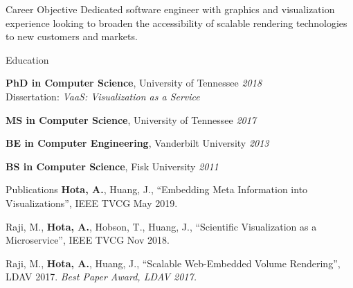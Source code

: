 \documentclass{resume} %
\begin{document}
\begin{multicols}{2}


\begin{rSection}{Career Objective}
  Dedicated software engineer with graphics and visualization experience looking to
  broaden the accessibility of scalable rendering technologies to new customers and
  markets.
\end{rSection}


\begin{rSection}{Education}

{{\bf PhD in Computer Science}, University of Tennessee} \hfill {\em 2018} \\ 
Dissertation: \emph{VaaS: Visualization as a Service}

{{\bf MS in Computer Science}, University of Tennessee} \hfill {\em 2017}

{{\bf BE in Computer Engineering}, Vanderbilt University} \hfill {\em 2013}

{{\bf BS in Computer Science}, Fisk University} \hfill {\em 2011}

\end{rSection}

\vfill\null
\columnbreak


\begin{rSection}{Publications}
  \textbf{Hota, A.}, Huang, J., ``Embedding Meta Information into Visualizations'', IEEE TVCG May 2019. \href{https://doi.org/10.1109/TVCG.2019.2916098}{\faLink}

  Raji, M., \textbf{Hota, A.}, Hobson, T., Huang, J., ``Scientific Visualization as a Microservice'', IEEE TVCG Nov 2018. \href{https://doi.org/10.1109/TVCG.2018.2879672}{\faLink}

  Raji, M., \textbf{Hota, A.}, Huang, J., ``Scalable Web-Embedded Volume Rendering'', LDAV 2017.
  \textit{Best Paper Award, LDAV 2017.} \href{http://web.eecs.utk.edu/~ahota/pdfs/tapestry-ldav-2017.pdf}{\faFilePdfO}


\end{rSection}
\end{multicols}
\end{document}
